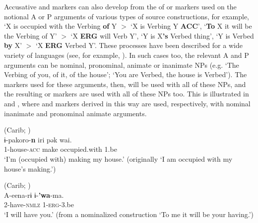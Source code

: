 \documentclass[output=paper]{langsci/langscibook}
\begin{document}
Accusative and  markers  can  also develop from the
   of  or  markers used on the notional A or
  P arguments of various types of source constructions, for example,
  `X is occupied with the Verbing  {\bf of} Y $>$ `X
        is Verbing Y {\bf ACC}', `{\bf To} X it will be the Verbing
        of Y' $>$ `X {\bf ERG} 
        will Verb Y',  `Y is X{\bf 's} Verbed thing', `Y is
        Verbed {\bf by} X'
        $>$ `X {\bf ERG} Verbed Y'. These processes have been described for
        a wide variety of languages (see, for example,
     \citealt{HarrisCampbell1995,Bubenik1998,Gildea1998,Creissels2008}). In such cases
        too,  the relevant A and P arguments can be nominal,
        pronominal, animate or inanimate NPs (e.g. `The Verbing of
        you, of it, of the house'; `You are Verbed, the house is
        Verbed'). The  markers used for these arguments, then,  will
        be used with all of these NPs, and the resulting  or
         markers are used with all of these NPs too. This is
        illustrated in  and , where  and
         markers derived in this way are used, respectively,
        with nominal inanimate and pronominal animate arguments.

\newpage

\ea\label{wayana}
 (Carib;  )\\
\gll ​ɨ-pakoro-\textbf{{n}} iri pək wai.\\
1-house-\textsc{acc} make occupied.with 1.be\\
\glt `I'm (occupied with) making my house.' (originally `I am occupied with my house's making.')

\z

\ea\label{carina}
 (Carib;  )\\
\gll A-eena-r​ɨ ​ɨ-\textbf{{'wa}}-ma.\\
2-have-\textsc{nmlz} 1-\textsc{erg}-3.be\\
\glt `I will have you.' (from a nominalized construction `To me it will be your having.')

\z
\end{document}
